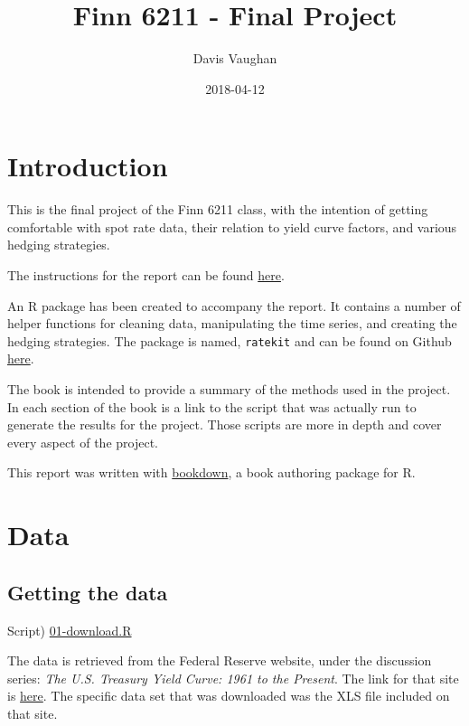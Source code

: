 \documentclass[]{book}
\title{Finn 6211 - Final Project}
\author{Davis Vaughan}
\date{2018-04-12}
\theoremstyle{definition}
\theoremstyle{definition}
\theoremstyle{definition}
\theoremstyle{remark}
\begin{document}
\maketitle

{
\setcounter{tocdepth}{1}
\tableofcontents
}
\hypertarget{titlepage}{%
\chapter{Introduction}\label{titlepage}}

This is the final project of the Finn 6211 class, with the intention of
getting comfortable with spot rate data, their relation to yield curve
factors, and various hedging strategies.

The instructions for the report can be found
\href{./instructions/Hedging_Project_S18.pdf}{here}.

An R package has been created to accompany the report. It contains a
number of helper functions for cleaning data, manipulating the time
series, and creating the hedging strategies. The package is named,
\texttt{ratekit} and can be found on Github
\href{https://github.com/DavisVaughan/ratekit}{here}.

The book is intended to provide a summary of the methods used in the
project. In each section of the book is a link to the script that was
actually run to generate the results for the project. Those scripts are
more in depth and cover every aspect of the project.

This report was written with
\href{https://bookdown.org/yihui/bookdown/}{bookdown}, a book authoring
package for R.

\hypertarget{data}{%
\chapter{Data}\label{data}}

\hypertarget{retrieve}{%
\section{Getting the data}\label{retrieve}}

Script) \href{./R/01-download.R}{01-download.R}

The data is retrieved from the Federal Reserve website, under the
discussion series: \emph{The U.S. Treasury Yield Curve: 1961 to the
Present}. The link for that site is
\href{https://www.federalreserve.gov/pubs/feds/2006/200628/200628abs.html}{here}.
The specific data set that was downloaded was the XLS file included on
that site.
\end{document}
